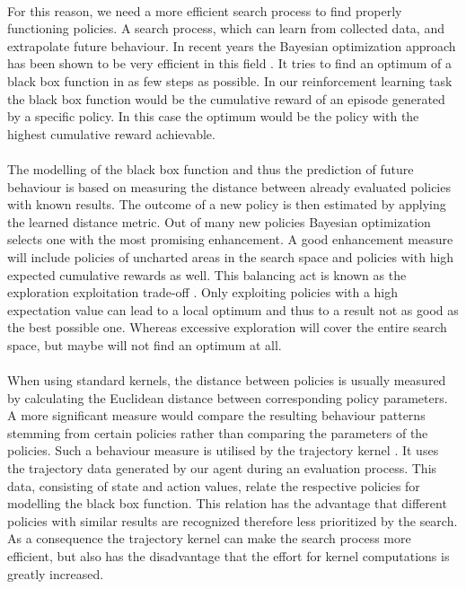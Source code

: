\\
For this reason, we need a more efficient search process to find properly functioning policies. A search process, which can learn from collected data, and extrapolate future behaviour. In recent years the Bayesian optimization approach has been shown to be very efficient in this field \cite{brochu2010tutorial, shahriari2016taking, lizotte2008practical}. It tries to find an optimum of a black box function in as few steps as possible. In our reinforcement learning task the black box function would be the cumulative reward of an episode generated by a specific policy. In this case the optimum would be the policy with the highest cumulative reward achievable.\\
\\
The modelling of the black box function and thus the prediction of future behaviour is based on measuring the distance between already evaluated policies with known results. The outcome of a new policy is then estimated by applying the learned distance metric. Out of many new policies Bayesian optimization selects one with the most promising enhancement. A good enhancement measure will include policies of uncharted areas in the search space and policies with high expected cumulative rewards as well. This balancing act is known as the exploration exploitation trade-off \cite{brochu2010tutorial}. Only exploiting policies with a high expectation value can lead to a local optimum and thus to a result not as good as the best possible one. Whereas excessive exploration will cover the entire search space, but maybe will not find an optimum at all.\\
\\
When using standard kernels, the distance between policies is usually measured by calculating the Euclidean distance \cite{rasmussen2006gaussian} between corresponding policy parameters. A more significant measure would compare the resulting behaviour patterns stemming from certain policies rather than comparing the parameters of the policies. Such a behaviour measure is utilised by the trajectory kernel \cite{wilson2014using}. It uses the trajectory data generated by our agent during an evaluation process. This data, consisting of state and action values, relate the respective policies for modelling the black box function. This relation has the advantage that different policies with similar results are recognized therefore less prioritized by the search. As a consequence the trajectory kernel can make the search process more efficient, but also has the disadvantage that the effort for kernel computations is greatly increased.\\

